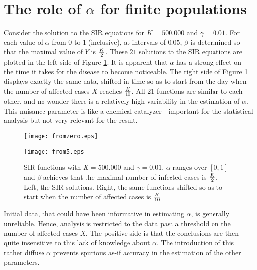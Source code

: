 \documentclass{article}
\begin{document}
\section{The role of $\alpha$ for finite populations}
Consider the solution to the SIR equations for $K=500.000$ and $\gamma=0.01$. For each value of $\alpha$ from $0$ to $1$ (inclusive), at intervals of $0.05$, $\beta$ is determined so that the maximal value of $Y$ is ${K \over 2}$. These $21$ solutions to the SIR equations are plotted in the left side of Figure \ref{fromtimes}. It is apparent that $\alpha$ has a strong effect on the time it takes for the disease to become noticeable. The right side of Figure \ref{fromtimes} displays exactly the same data, shifted in time so as to start from the day when the number of affected cases $X$ reaches ${K \over 10}$. All $21$ functions are similar to each other, and no wonder there is a relatively high variability in the estimation of $\alpha$. This nuisance parameter is like a chemical catalyzer - important for the statistical analysis but not very relevant for the result.
\begin{figure}
	
	\begin{center}
	
	
	{\texttt{[image: fromzero.eps]}}
	
	\qquad
	
	{\texttt{[image: from5.eps]}}
	
	\end{center}
	
	\begin{center}
	\caption{SIR functions with $K=500.000$ and $\gamma=0.01$. $\alpha$ ranges over $[0,1]$ and $\beta$ achieves that the maximal number of infected cases is ${K \over 2}$. Left, the SIR solutions. Right, the same functions shifted so as to start when the number of affected cases is ${K \over 10}$
	}
	\label{fromtimes}
	\end{center}
\end{figure}
	
	
	Initial data, that could have been informative in estimating $\alpha$, is generally unreliable. Hence, analysis is restricted to the data past a threshold on the number of affected cases $X$. The positive side is that the conclusions are then quite insensitive to this lack of knowledge about $\alpha$. The introduction of this rather diffuse $\alpha$ prevents spurious as-if accuracy in the estimation of the other parameters.
	
\end{document}
